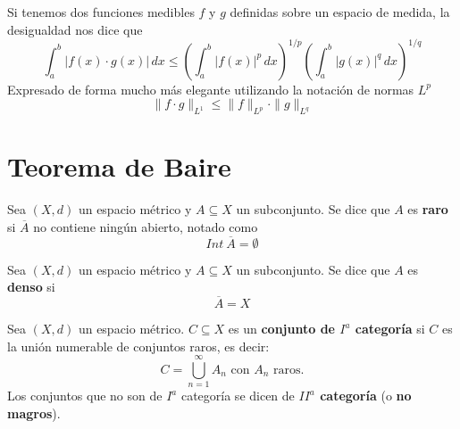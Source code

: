 \begin{prop}
    Si tenemos dos funciones medibles $f$ y $g$ definidas sobre un espacio de medida, la desigualdad nos dice que
    $$\int_{a}^{b} |f(x) \cdot g(x)| \, dx \leq \left( \int_{a}^{b} |f(x)|^p \, dx \right)^{1/p} \left( \int_{a}^{b} |g(x)|^q \, dx \right)^{1/q}$$
    Expresado de forma mucho más elegante utilizando la notación de normas $L^p$
    $$\|f \cdot g\|_{L^1} \leq \|f\|_{L^p} \cdot \|g\|_{L^q}$$
\end{prop}

\section{Teorema de Baire}

\begin{definicion}
    Sea $(X, d)$ un espacio métrico y $A \subseteq X$ un subconjunto. Se dice que $A$ es \textbf{raro} si $\overline{A}$ no contiene ningún abierto, notado como
    \begin{equation*}
        Int \ \overline{A} = \emptyset
    \end{equation*}
\end{definicion}

\begin{definicion}
    Sea $(X, d)$ un espacio métrico y $A \subseteq X$ un subconjunto. Se dice que $A$ es \textbf{denso} si 
    \begin{equation*}
        \overline{A} = X
    \end{equation*}
\end{definicion}

\begin{definicion}
    Sea $(X, d)$ un espacio métrico. $C \subseteq X$ es un \textbf{conjunto de $I^a$ categoría} si $C$ es la unión numerable de conjuntos raros, es decir:
    \begin{equation*}
        C = \bigcup_{n=1}^{\infty} A_n \text{ con } A_n \text{ raros}.
    \end{equation*}
    Los conjuntos que no son de $I^a$ categoría se dicen de \textbf{$II^a$ categoría} (o \textbf{no magros}).
\end{definicion}

